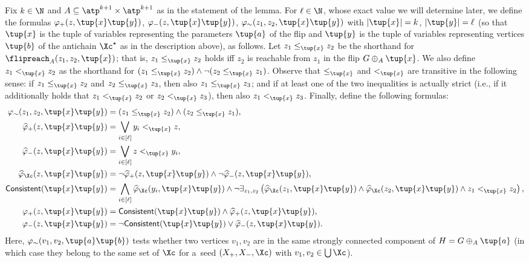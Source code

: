 Fix $k \in \N$ and $A \subseteq \atp^{k+1} \times \atp^{k+1}$ as in the statement of the lemma.
For $\ell \in \N$, whose exact value we will determine later, we define the formulas $\varphi_+(z, \tup{x}\tup{y})$, $\varphi_-(z, \tup{x}\tup{y})$, $\varphi_\sim(z_1, z_2, \tup{x}\tup{y})$ with $|\tup{x}| = k$, $|\tup{y}| = \ell$ (so that $\tup{x}$ is the tuple of variables representing the parameters $\tup{a}$ of the flip and $\tup{y}$ is the tuple of variables representing vertices $\tup{b}$ of the antichain $\Xc^\star$ as in the description above), as follows.
Let $z_1 \leq_{\tup{x}} z_2$ be the shorthand for $\flipreach_A(z_1, z_2, \tup{x})$; that is, $z_1 \leq_{\tup{x}} z_2$ holds iff $z_2$ is reachable from $z_1$ in the flip $G \oplus_A \tup{x}$.
We also define $z_1 <_{\tup{x}} z_2$ as the shorthand for $(z_1 \leq_{\tup{x}} z_2) \wedge \neg (z_2 \leq_{\tup{x}} z_1)$.
Observe that $\leq_{\tup{x}}$ and $<_{\tup{x}}$ are transitive in the following sense: if $z_1 \leq_{\tup{x}} z_2$ and $z_2 \leq_{\tup{x}} z_3$, then also $z_1 \leq_{\tup{x}} z_3$; and if at least one of the two inequalities is actually strict (i.e., if it additionally holds that $z_1 <_{\tup{x}} z_2$ or $z_2 <_{\tup{x}} z_3$), then also $z_1 <_{\tup{x}} z_3$.
Finally, define the following formulas:
\begin{align*}
    \varphi_\sim(z_1, z_2, \tup{x}\tup{y}) &= (z_1 \leq_{\tup{x}} z_2) \wedge (z_2 \leq_{\tup{x}} z_1), \\
    \widehat{\varphi}_+(z, \tup{x}\tup{y}) &= \bigvee_{i \in [\ell]} y_i <_{\tup{x}} z, \\
    \widehat{\varphi}_-(z, \tup{x}\tup{y}) &= \bigvee_{i \in [\ell]} z <_{\tup{x}} y_i, \\
    \widehat{\varphi}_\Xc(z, \tup{x}\tup{y}) &= \neg\widehat{\varphi}_+(z, \tup{x}\tup{y}) \wedge \neg\widehat{\varphi}_-(z, \tup{x}\tup{y}), \\
    \IsConsistent(\tup{x}\tup{y}) &= \bigwedge_{i \in [\ell]} \widehat{\varphi}_\Xc(y_i, \tup{x}\tup{y}) \wedge \neg\exists_{z_1, z_2} \left( \widehat{\varphi}_\Xc(z_1, \tup{x}\tup{y}) \wedge \widehat{\varphi}_\Xc(z_2, \tup{x}\tup{y}) \wedge z_1 <_{\tup{x}} z_2 \right), \\
    \varphi_+(z, \tup{x}\tup{y}) &= \IsConsistent(\tup{x}\tup{y}) \wedge \widehat{\varphi}_+(z, \tup{x}\tup{y}), \\
    \varphi_-(z, \tup{x}\tup{y}) &= \neg\IsConsistent(\tup{x}\tup{y}) \vee \widehat{\varphi}_-(z, \tup{x}\tup{y}).
\end{align*}
Here, $\varphi_\sim(v_1, v_2, \tup{a}\tup{b})$ tests whether two vertices $v_1, v_2$ are in the same strongly connected component of $H = G \oplus_A \tup{a}$ (in which case they belong to the same set of $\Xc$ for a~seed $(X_+, X_-, \Xc)$ with $v_1, v_2 \in \bigcup \Xc$).
